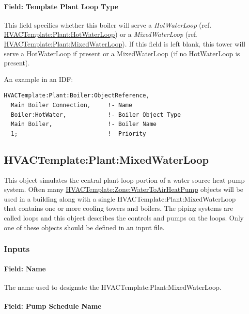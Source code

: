 \paragraph{Field: Template Plant Loop Type}\label{field-template-plant-loop-type-3}

This field specifies whether this boiler will serve a \emph{HotWaterLoop} (ref. \hyperref[hvactemplateplanthotwaterloop]{HVACTemplate:Plant:HotWaterLoop}) or a \emph{MixedWaterLoop} (ref. \hyperref[hvactemplateplantmixedwaterloop]{HVACTemplate:Plant:MixedWaterLoop}). If this field is left blank, this tower will serve a HotWaterLoop if present or a MixedWaterLoop (if no HotWaterLoop is present).

An example in an IDF:

\begin{lstlisting}
HVACTemplate:Plant:Boiler:ObjectReference,
  Main Boiler Connection,     !- Name
  Boiler:HotWater,            !- Boiler Object Type
  Main Boiler,                !- Boiler Name
  1;                          !- Priority
\end{lstlisting}

\subsection{HVACTemplate:Plant:MixedWaterLoop}\label{hvactemplateplantmixedwaterloop}

This object simulates the central plant loop portion of a water source heat pump system. Often many \hyperref[hvactemplatezonewatertoairheatpump]{HVACTemplate:Zone:WaterToAirHeatPump} objects will be used in a building along with a single HVACTemplate:Plant:MixedWaterLoop that contains one or more cooling towers and boilers. The piping systems are called loops and this object describes the controls and pumps on the loops. Only one of these objects should be defined in an input file.

\subsubsection{Inputs}\label{inputs-31-000}

\paragraph{Field: Name}\label{field-name-18-002}

The name used to designate the HVACTemplate:Plant:MixedWaterLoop.

\paragraph{Field: Pump Schedule Name}\label{field-pump-schedule-name-2}

